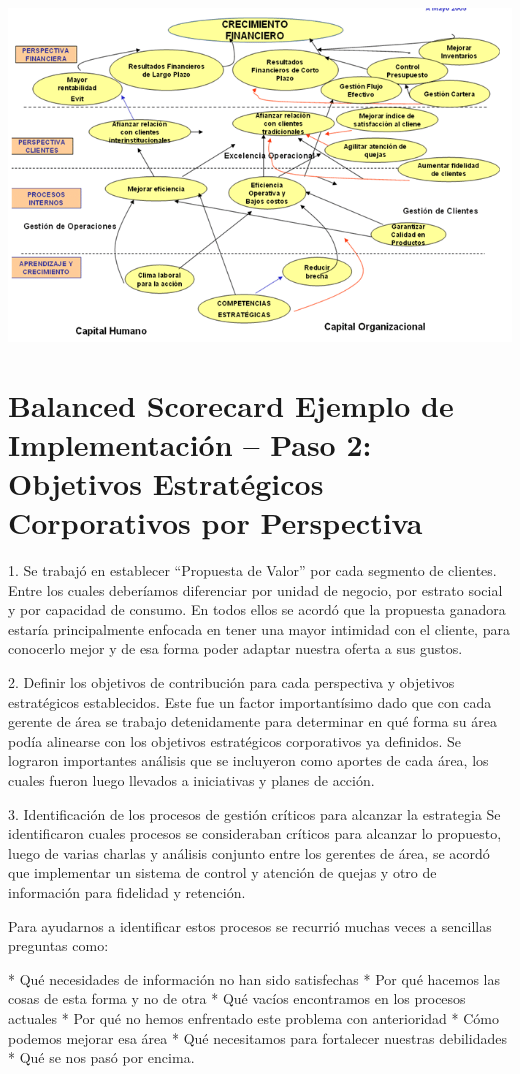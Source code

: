 \begin{center}
\includegraphics[width=15cm]{./Imagenes/ImagenEmpresa3.png}
\end{center}

\section{Balanced Scorecard Ejemplo de Implementación – Paso 2: Objetivos Estratégicos Corporativos por Perspectiva}
\item {1. Se trabajó en establecer “Propuesta de Valor” por cada segmento de clientes. Entre los cuales deberíamos diferenciar por unidad de negocio, por estrato social y por capacidad de consumo. En todos ellos se acordó que la propuesta ganadora estaría principalmente enfocada en tener una mayor intimidad con el cliente, para conocerlo mejor y de esa forma poder adaptar nuestra oferta a sus gustos.

2. Definir los objetivos de contribución para cada perspectiva y objetivos estratégicos establecidos.  Este fue un factor importantísimo dado que con cada gerente de área se trabajo detenidamente para determinar en qué forma su área podía alinearse con los objetivos estratégicos corporativos ya definidos. Se lograron importantes análisis que se incluyeron como aportes de cada área, los cuales fueron luego llevados a iniciativas y planes de acción.

3. Identificación de los procesos de gestión críticos para alcanzar la estrategia
Se identificaron cuales procesos se consideraban críticos para alcanzar lo propuesto, luego de varias charlas y análisis conjunto entre los gerentes de área, se acordó que implementar un sistema de control y atención de quejas y otro de información para fidelidad y retención.

Para ayudarnos a identificar estos procesos se recurrió muchas veces a sencillas preguntas como:

* Qué necesidades de información no han sido satisfechas
* Por qué hacemos las cosas de esta forma y no de otra
* Qué vacíos encontramos en los procesos actuales
* Por qué no hemos enfrentado este problema con anterioridad
* Cómo podemos mejorar esa área
* Qué necesitamos para fortalecer nuestras debilidades
* Qué se nos pasó por encima.}






